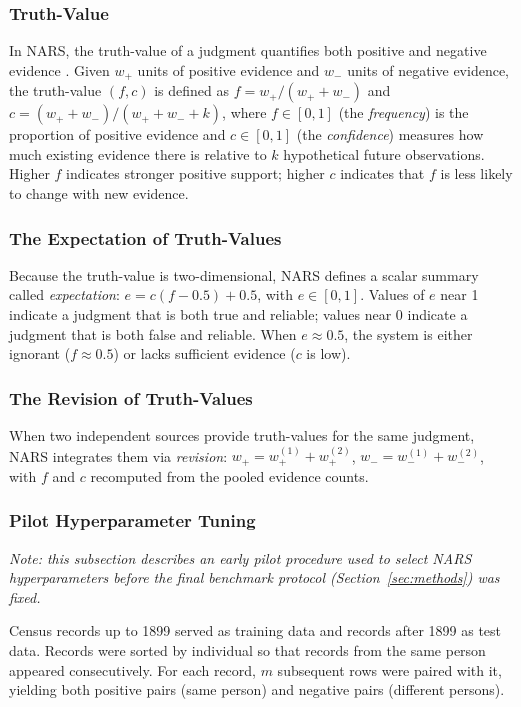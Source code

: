 \documentclass{article}
\begin{document}
\subsubsection{Truth-Value}

In NARS, the truth-value of a judgment quantifies both positive and negative evidence \cite{wang}. Given $w_+$ units of positive evidence and $w_-$ units of negative evidence, the truth-value $(f, c)$ is defined as $f=w_+/(w_++w_-)$ and $c=(w_++w_-)/(w_++w_-+k)$, where $f \in [0,1]$ (the \emph{frequency}) is the proportion of positive evidence and $c \in [0,1]$ (the \emph{confidence}) measures how much existing evidence there is relative to $k$ hypothetical future observations. Higher $f$ indicates stronger positive support; higher $c$ indicates that $f$ is less likely to change with new evidence.

\subsubsection{The Expectation of Truth-Values}

Because the truth-value is two-dimensional, NARS defines a scalar summary called \emph{expectation}: $e = c(f-0.5) + 0.5$, with $e\in [0,1]$. Values of $e$ near 1 indicate a judgment that is both true and reliable; values near 0 indicate a judgment that is both false and reliable. When $e \approx 0.5$, the system is either ignorant ($f \approx 0.5$) or lacks sufficient evidence ($c$ is low).

\subsubsection{The Revision of Truth-Values}

When two independent sources provide truth-values for the same judgment, NARS integrates them via \emph{revision}: $w_+=w_+^{(1)}+w_+^{(2)}$, $w_-=w_-^{(1)}+w_-^{(2)}$, with $f$ and $c$ recomputed from the pooled evidence counts.

\subsubsection{Pilot Hyperparameter Tuning}

\emph{Note: this subsection describes an early pilot procedure used to select NARS hyperparameters before the final benchmark protocol (Section~\ref{sec:methods}) was fixed.}

Census records up to 1899 served as training data and records after 1899 as test data. Records were sorted by individual so that records from the same person appeared consecutively. For each record, $m$ subsequent rows were paired with it, yielding both positive pairs (same person) and negative pairs (different persons).
\end{document}
